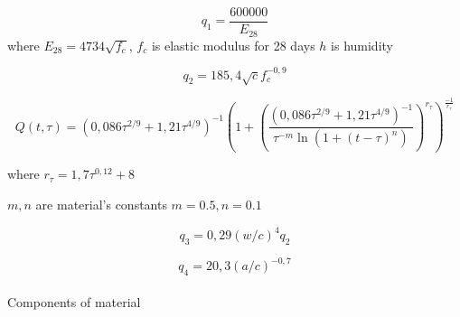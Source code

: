 \begin{equation}
q_1 = \frac{600000}{E_{28}}
\end{equation}
where $E_{28} = 4734 \sqrt{f_c} $, $f_c $ is elastic modulus for 28 days
$h$ is humidity


\begin{equation}
q_2 = 185,4 \sqrt{c} f^{-0,9}_c
\end{equation}


\begin{equation}
Q(t,\tau) = \left(0,086 \tau^{2/9} + 1,21 \tau^{4/9} \right)^{-1}  
\left( 1 + \left( \frac{ \left(0,086 \tau^{2/9} + 1,21 \tau^{4/9} \right)^{-1} } 
{\tau^{-m} \ln {\left( 1 + (t- \tau)^n \right) } } \right)^{r_\tau } \right)^{\frac{-1}{r_\tau}} 
\end{equation}


where $ r_\tau = 1,7 \tau^{0,12} +8 $

$m, n$ are material's constants $m=0.5, n=0.1$

\begin{equation}
q_3 = 0,29 (w/c)^4  q_2
\end{equation}


\begin{equation}
q_4 = 20,3 (a/c)^{-0,7}
\end{equation}
\\


Components of material

